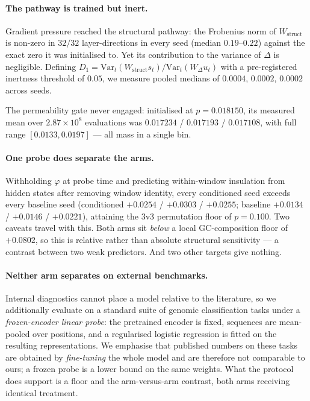 \documentclass[10pt]{article}
\begin{document}
\paragraph{The pathway is trained but inert.}
Gradient pressure reached the structural pathway: the Frobenius norm of
$W_{\text{struct}}$ is non-zero in $32/32$ layer-directions in every seed
(median $0.19$--$0.22$) against the exact zero it was initialised to. Yet its
contribution to the variance of $\Delta$ is negligible. Defining
$D_1 = \mathrm{Var}_t(W_{\text{struct}}s_t)/\mathrm{Var}_t(W_\Delta u_t)$ with a
pre-registered inertness threshold of $0.05$, we measure pooled medians of
$0.0004$, $0.0002$, $0.0002$ across seeds.

The permeability gate never engaged: initialised at $p = 0.018150$, its measured
mean over $2.87\times10^{8}$ evaluations was $0.017234$ / $0.017193$ /
$0.017108$, with full range $[0.0133, 0.0197]$ --- all mass in a single bin.

\paragraph{One probe does separate the arms.}
Withholding $\varphi$ at probe time and predicting within-window insulation from
hidden states after removing window identity, every conditioned seed exceeds
every baseline seed (conditioned $+0.0254$ / $+0.0303$ / $+0.0255$; baseline
$+0.0134$ / $+0.0146$ / $+0.0221$), attaining the $3$v$3$ permutation floor of
$p = 0.100$. Two caveats travel with this. Both arms sit \emph{below} a local
GC-composition floor of $+0.0802$, so this is relative rather than absolute
structural sensitivity --- a contrast between two weak predictors. And two other
targets give nothing.

\paragraph{Neither arm separates on external benchmarks.}
Internal diagnostics cannot place a model relative to the literature, so we
additionally evaluate on a standard suite of genomic classification tasks
\citep{gresova2023} under a \emph{frozen-encoder linear probe}: the pretrained
encoder is fixed, sequences are mean-pooled over positions, and a regularised
logistic regression is fitted on the resulting representations. We emphasise
that published numbers on these tasks are obtained by \emph{fine-tuning} the
whole model and are therefore not comparable to ours; a frozen probe is a lower
bound on the same weights. What the protocol does support is a floor and the
arm-versus-arm contrast, both arms receiving identical treatment.
\end{document}
